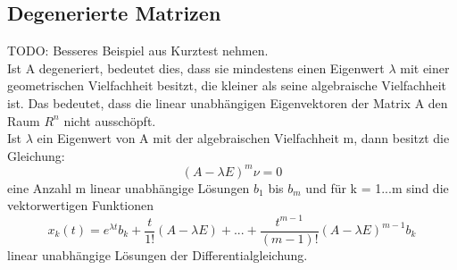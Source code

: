 \subsection{Degenerierte Matrizen}
TODO: Besseres Beispiel aus Kurztest nehmen. \\
Ist A degeneriert, bedeutet dies, dass sie mindestens einen Eigenwert $\lambda$ mit einer geometrischen Vielfachheit besitzt, die kleiner als seine algebraische Vielfachheit ist. 
Das bedeutet, dass die linear unabhängigen Eigenvektoren der Matrix A den Raum $R^n$ nicht ausschöpft.\\
Ist $\lambda$ ein Eigenwert von A mit der algebraischen Vielfachheit m, dann besitzt die Gleichung: 
\begin{equation*}
(A-\lambda E)^m\nu = 0
\end{equation*}
eine Anzahl m linear unabhängige Lösungen $b_1$ bis $b_m$ und für k = 1...m sind die vektorwertigen Funktionen
\begin{equation*}
x_k(t) = e^{\lambda t}{b_k + \frac{t}{1!}(A-\lambda E) + ... + \frac{t^{m-1}}{(m-1)!}(A-\lambda E)^{m-1}b_k}
\end{equation*}
linear unabhängige Lösungen der Differentialgleichung. 
